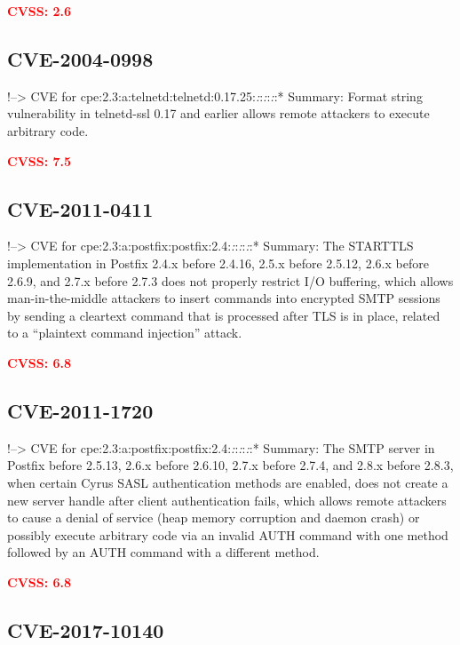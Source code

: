 \documentclass[a4paper, 12pt]{article}
\begin{document}
\textbf{\textcolor{red}{CVSS: 2.6}}

\hypertarget{cve-2004-0998}{%
\subsection{CVE-2004-0998}\label{cve-2004-0998}}

!--\textgreater{} CVE for
cpe:2.3:a:telnetd:telnetd:0.17.25:\emph{:}:\emph{:}:\emph{:}:* Summary:
Format string vulnerability in telnetd-ssl 0.17 and earlier allows
remote attackers to execute arbitrary code.

\textbf{\textcolor{red}{CVSS: 7.5}}

\hypertarget{cve-2011-0411}{%
\subsection{CVE-2011-0411}\label{cve-2011-0411}}

!--\textgreater{} CVE for
cpe:2.3:a:postfix:postfix:2.4:\emph{:}:\emph{:}:\emph{:}:* Summary: The
STARTTLS implementation in Postfix 2.4.x before 2.4.16, 2.5.x before
2.5.12, 2.6.x before 2.6.9, and 2.7.x before 2.7.3 does not properly
restrict I/O buffering, which allows man-in-the-middle attackers to
insert commands into encrypted SMTP sessions by sending a cleartext
command that is processed after TLS is in place, related to a
``plaintext command injection'' attack.

\textbf{\textcolor{red}{CVSS: 6.8}}

\hypertarget{cve-2011-1720}{%
\subsection{CVE-2011-1720}\label{cve-2011-1720}}

!--\textgreater{} CVE for
cpe:2.3:a:postfix:postfix:2.4:\emph{:}:\emph{:}:\emph{:}:* Summary: The
SMTP server in Postfix before 2.5.13, 2.6.x before 2.6.10, 2.7.x before
2.7.4, and 2.8.x before 2.8.3, when certain Cyrus SASL authentication
methods are enabled, does not create a new server handle after client
authentication fails, which allows remote attackers to cause a denial of
service (heap memory corruption and daemon crash) or possibly execute
arbitrary code via an invalid AUTH command with one method followed by
an AUTH command with a different method.

\textbf{\textcolor{red}{CVSS: 6.8}}

\hypertarget{cve-2017-10140}{%
\subsection{CVE-2017-10140}\label{cve-2017-10140}}
\end{document}
